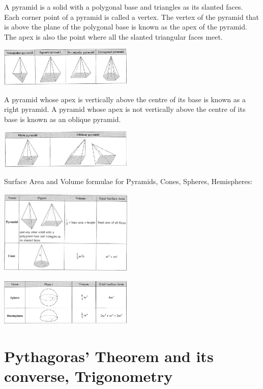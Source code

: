 \documentclass[twocolumn]{article}
\begin{document}
\bigskip 

\noindent 
A pyramid is a solid with a polygonal base and triangles as its slanted faces. Each corner point of a pyramid is called a vertex. The vertex of the pyramid that is above the plane of the polygonal base is known as the apex of the pyramid. The apex is also the point where all the slanted triangular faces meet.

\includegraphics[width=0.48\textwidth]{85.png}

\bigskip 

\noindent 
A pyramid whose apex is vertically above the centre of its base is known as a right pyramid. A pyramid whose apex is not vertically above the centre of its base is known as an oblique pyramid. 

\includegraphics[width=0.48\textwidth]{86.png}

\bigskip 

\noindent 
Surface Area and Volume formulae for Pyramids, Cones, Spheres, Hemispheres:

\bigskip 

\includegraphics[width=0.48\textwidth]{83.png}

\includegraphics[width=0.48\textwidth]{88.png}

\newpage 

\section*{Pythagoras' Theorem and its converse, Trigonometry}
\end{document}
